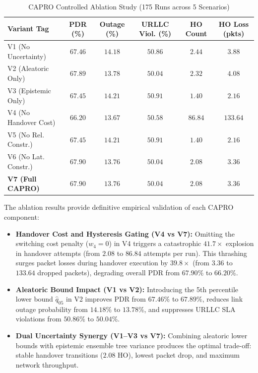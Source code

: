 \documentclass[conference]{IEEEtran}
\begin{document}
\begin{table}[h]
\caption{CAPRO Controlled Ablation Study (175 Runs across 5 Scenarios)}
\label{tab:ablation}
\centering
\begin{tabular}{lccccc}
\toprule
\textbf{Variant Tag} & \textbf{PDR (\%)} & \textbf{Outage (\%)} & \textbf{URLLC Viol. (\%)} & \textbf{HO Count} & \textbf{HO Loss (pkts)} \\
\midrule
V1 (No Uncertainty)   & $67.46$ & $14.18$ & $50.86$ & $2.44$  & $3.88$ \\
V2 (Aleatoric Only)   & $67.89$ & $13.78$ & $50.04$ & $2.32$  & $4.08$ \\
V3 (Epistemic Only)   & $67.45$ & $14.21$ & $50.91$ & $1.40$  & $2.16$ \\
V4 (No Handover Cost) & $66.20$ & $13.67$ & $50.58$ & $\mathbf{86.84}$ & $\mathbf{133.64}$ \\
V5 (No Rel. Constr.)  & $67.45$ & $14.21$ & $50.91$ & $1.40$  & $2.16$ \\
V6 (No Lat. Constr.)  & $67.90$ & $13.76$ & $50.04$ & $2.08$  & $3.36$ \\
\textbf{V7 (Full CAPRO)} & $\mathbf{67.90}$ & $\mathbf{13.76}$ & $\mathbf{50.04}$ & $\mathbf{2.08}$ & $\mathbf{3.36}$ \\
\bottomrule
\end{tabular}
\end{table}

The ablation results provide definitive empirical validation of each CAPRO component:
\begin{itemize}
    \item \textbf{Handover Cost and Hysteresis Gating (V4 vs V7):} Omitting the switching cost penalty ($w_4 = 0$) in V4 triggers a catastrophic $41.7\times$ explosion in handover attempts (from $2.08$ to $86.84$ attempts per run). This thrashing surges packet losses during handover execution by $39.8\times$ (from $3.36$ to $133.64$ dropped packets), degrading overall PDR from $67.90\%$ to $66.20\%$.
    \item \textbf{Aleatoric Bound Impact (V1 vs V2):} Introducing the 5th percentile lower bound $\hat{q}_{05}$ in V2 improves PDR from $67.46\%$ to $67.89\%$, reduces link outage probability from $14.18\%$ to $13.78\%$, and suppresses URLLC SLA violations from $50.86\%$ to $50.04\%$.
    \item \textbf{Dual Uncertainty Synergy (V1--V3 vs V7):} Combining aleatoric lower bounds with epistemic ensemble tree variance produces the optimal trade-off: stable handover transitions ($2.08$ HO), lowest packet drop, and maximum network throughput.
\end{itemize}
\end{document}
